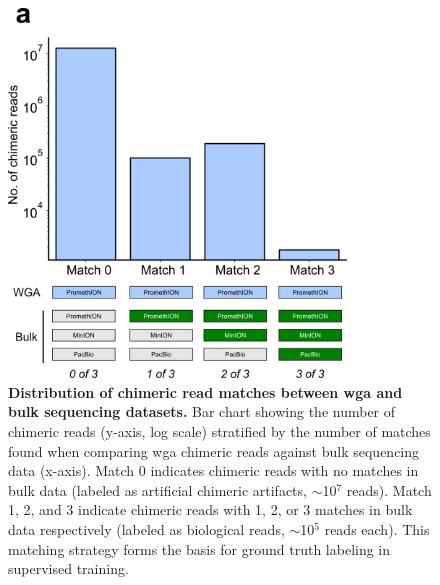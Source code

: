 \documentclass[pdflatex,sn-nature,lineno]{sn-jnl}%
\theoremstyle{thmstyleone}%
\theoremstyle{thmstyletwo}%
\theoremstyle{thmstylethree}%
\begin{document}
\begin{figure}[!ht]
	\begin{center}
		\includegraphics[width=0.8\textwidth]{final_figures/sf1}
	\end{center}
	\caption{{\bf Distribution of chimeric read matches between \gls{wga} and bulk sequencing datasets.}
		Bar chart showing the number of chimeric reads (y-axis, log scale) stratified by the number of matches found when comparing \gls{wga} chimeric reads against bulk sequencing data (x-axis). Match 0 indicates chimeric reads with no matches in bulk data (labeled as artificial chimeric artifacts, $\sim$10$^7$ reads). Match 1, 2, and 3 indicate chimeric reads with 1, 2, or 3 matches in bulk data respectively (labeled as biological reads, $\sim$10$^5$ reads each). This matching strategy forms the basis for ground truth labeling in supervised training.}\label{fig:sf1}
\end{figure}

\end{document}

